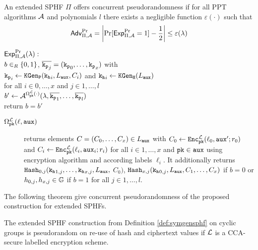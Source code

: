 \begin{definition}\label{def:prplusc}
An extended \ac{SPHF} $\Pi$ offers concurrent pseudorandomness if for all \ac{PPT} algorithms $\mathcal{A}$ and polynomials $l$ there exists a negligible function $\varepsilon(\cdot)$ such that
\[\mathsf{Adv}_{\Pi,\mathcal{A}}^{\Pr}=\left|\Pr[\mathsf{Exp}_{\Pi,\mathcal{A}}^{\Pr}=1] - \frac12 \right|\leq \varepsilon(\lambda)\]

\noindent
$\mathsf{Exp}_{\Pi,\mathcal{A}}^{\Pr}(\lambda):$ \\
\hspace*{2em} $b\in_R\{0,1\}$, $\overline{\mathtt{k_p}_j}=(\mathtt{k_p}_0,\dots,\mathtt{k_p}_x)$ with \\
\hspace*{2em} $\mathtt{k_p}_i\gets\mathtt{KGen_P}(\mathtt{k_h}_i,L_\mathtt{aux},C_i)$ and $\mathtt{k_h}_i\gets\mathtt{KGen_H}(L_\mathtt{aux})$ \\
\hspace*{4em} for all $i\in 0,\dots,x$ and $j\in 1,\dots,l$ \\
\hspace*{2em} $b'\gets\mathcal{A}^{\Omega^{\mathcal{L}}_\mathtt{pk}(\cdot)}(\lambda,\overline{\mathtt{k_p}_1},\dots,\overline{\mathtt{k_p}_l})$ \\
\hspace*{2em} return $b=b'$

\begin{description}
	\item[$\Omega^{\mathcal{L}}_\mathtt{pk}(\ell,\mathtt{aux})$] returns elements $C=(C_0,\dots,C_x)\in L_\mathtt{aux}$ with $C_0\gets\mathtt{Enc}^\mathcal{L}_\mathtt{pk}(\ell_0,\allowbreak\mathtt{aux}';r_0)$ and $C_i\gets\mathtt{Enc}^\mathcal{L}_\mathtt{pk}\allowbreak(\ell_i,\mathtt{aux}_i;r_i)$ for all $i\in1,\dots,x$ and $\mathtt{pk}\in\mathtt{aux}$ using encryption algorithm \cL and according labels $\ell_i$.
	It additionally returns $\mathtt{Hash}_{0,j}(\mathtt{k_h}_{1,j},\dots,\mathtt{k_h}_{x,j},L_\mathtt{aux},$ $C_0)$, $\mathtt{Hash}_{x,j}(\mathtt{k_h}_{0,j},\allowbreak L_\mathtt{aux},C_1,\dots,C_x)$ if $b=0$ or $h_{0,j},\allowbreak h_{x,j}\in\mathbb{G}$ if $b=1$ for all $j\in 1,\dots, l$. \eod
\end{description}
\end{definition}

\noindent
The following theorem give concurrent pseudorandomness of the proposed construction for extended \acp{SPHF}.

\begin{lemma}\label{cor:pr}
The extended \ac{SPHF} construction from Definition \ref{def:symgensphf} on cyclic groups is pseudorandom on re-use of hash and ciphertext values if $\mathcal{L}$ is a \ac{CCA}-secure labelled encryption scheme.
\end{lemma}

